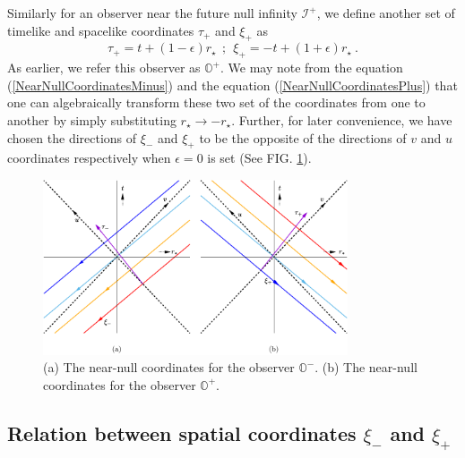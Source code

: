\documentclass[aps,twocolumn,showpacs]{revtex4}
\def\rstar{r_{\star}}
\def\scriplus{\mathscr{I}^{+}}
\def\observerminus{\mathbb{O}^{-}}
\def\observerplus{\mathbb{O}^{+}}
\begin{document}
Similarly for an observer near the future null infinity $\scriplus$, we define 
another set of timelike and spacelike coordinates $\tau_{+}$ and $\xi_{+}$ 
as
%
\begin{equation}\label{NearNullCoordinatesPlus}
\tau_{+} = t + (1-\epsilon)\rstar ~~;~~ \xi_{+} = -t + (1+\epsilon)\rstar  ~.
\end{equation}
%
As earlier, we refer this observer as $\observerplus$. We may note from the 
equation (\ref{NearNullCoordinatesMinus}) and the equation 
(\ref{NearNullCoordinatesPlus}) that one can algebraically transform these two 
set of the coordinates from one to another by simply substituting 
$\rstar \to -\rstar$. Further, for later convenience, we have chosen the 
directions of $\xi_{-}$ and $\xi_{+}$ to be the opposite of the directions of 
$v$ and $u$ coordinates respectively when $\epsilon=0$ is set (See FIG. 
\ref{fig:NearNull}).



\begin{figure}
\includegraphics[width=9cm]{near-null.pdf}
\caption{(a) The near-null coordinates for the observer $\observerminus$.
(b) The near-null coordinates for the observer $\observerplus$.}
\label{fig:NearNull} 
\end{figure}




\subsection{Relation between spatial coordinates $\xi_{-}$ and $\xi_{+}$}
\end{document}
